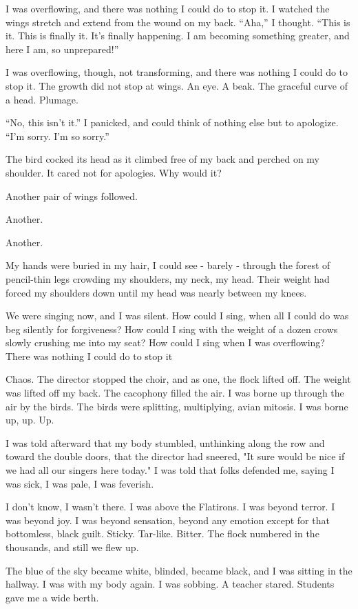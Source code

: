 \begin{paracol}{2}
\begin{leftcolumn}
I was overflowing, and there was nothing I could do to stop it. I watched the wings stretch and extend from the wound on my back. ``Aha,'' I thought. ``This is it. This is finally it. It's finally happening. I am becoming something greater, and here I am, so unprepared!''

I was overflowing, though, not transforming, and there was nothing I could do to stop it. The growth did not stop at wings. An eye. A beak. The graceful curve of a head. Plumage.

``No, this isn't it.'' I panicked, and could think of nothing else but to apologize. ``I'm sorry. I'm so sorry.''

The bird cocked its head as it climbed free of my back and perched on my shoulder. It cared not for apologies. Why would it?

Another pair of wings followed.

Another.

Another.

My hands were buried in my hair, I could see - barely - through the forest of pencil-thin legs crowding my shoulders, my neck, my head. Their weight had forced my shoulders down until my head was nearly between my knees.

We were singing now, and I was silent. How could I sing, when all I could do was beg silently for forgiveness? How could I sing with the weight of a dozen crows slowly crushing me into my seat? How could I sing when I was overflowing? There was nothing I could do to stop it

Chaos. The director stopped the choir, and as one, the flock lifted off. The weight was lifted off my back. The cacophony filled the air. I was borne up through the air by the birds. The birds were splitting, multiplying, avian mitosis. I was borne up, up. Up.

I was told afterward that my body stumbled, unthinking along the row and toward the double doors, that the director had sneered, "It sure would be nice if we had all our singers here today." I was told that folks defended me, saying I was sick, I was pale, I was feverish.

I don't know, I wasn't there. I was above the Flatirons. I was beyond terror. I was beyond joy. I was beyond sensation, beyond any emotion except for that bottomless, black guilt. Sticky. Tar-like. Bitter. The flock numbered in the thousands, and still we flew up.

The blue of the sky became white, blinded, became black, and I was sitting in the hallway. I was with my body again. I was sobbing. A teacher stared. Students gave me a wide berth.


\end{leftcolumn}
\end{paracol}
